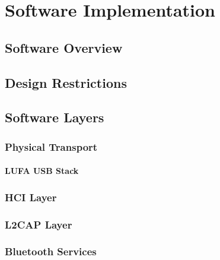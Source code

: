 \chapter{Software Implementation}
\label{Chapter 3}


\section{Software Overview}


\section{Design Restrictions}


\section{Software Layers}


\FloatBarrier
\subsection{Physical Transport}


\FloatBarrier
\subsubsection{LUFA USB Stack}


\FloatBarrier
\subsection{HCI Layer}


\FloatBarrier
\subsection{L2CAP Layer}


\FloatBarrier
\subsection{Bluetooth Services}


